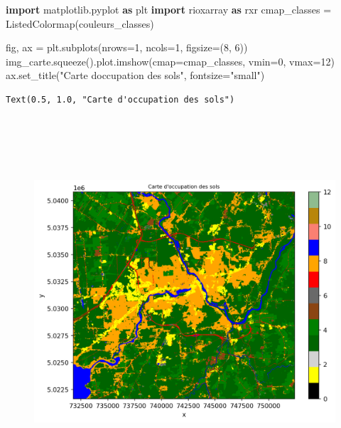 \documentclass[
]{article}
\newenvironment{Shaded}{}{}
\newcommand{\DecValTok}[1]{\textcolor[rgb]{0.25,0.63,0.44}{#1}}
\newcommand{\ImportTok}[1]{\textcolor[rgb]{0.00,0.50,0.00}{\textbf{#1}}}
\newcommand{\NormalTok}[1]{#1}
\newcommand{\OperatorTok}[1]{\textcolor[rgb]{0.40,0.40,0.40}{#1}}
\newcommand{\StringTok}[1]{\textcolor[rgb]{0.25,0.44,0.63}{#1}}
\begin{document}
\label{5c61a76f}
\label{cb6}
\begin{Shaded}
\begin{Highlighting}[]
\ImportTok{import}\NormalTok{ matplotlib.pyplot }\ImportTok{as}\NormalTok{ plt}
\ImportTok{import}\NormalTok{ rioxarray }\ImportTok{as}\NormalTok{ rxr}
\NormalTok{cmap\_classes }\OperatorTok{=}\NormalTok{ ListedColormap(couleurs\_classes)}

\NormalTok{fig, ax }\OperatorTok{=}\NormalTok{ plt.subplots(nrows}\OperatorTok{=}\DecValTok{1}\NormalTok{, ncols}\OperatorTok{=}\DecValTok{1}\NormalTok{, figsize}\OperatorTok{=}\NormalTok{(}\DecValTok{8}\NormalTok{, }\DecValTok{6}\NormalTok{))}
\NormalTok{img\_carte.squeeze().plot.imshow(cmap}\OperatorTok{=}\NormalTok{cmap\_classes, vmin}\OperatorTok{=}\DecValTok{0}\NormalTok{, vmax}\OperatorTok{=}\DecValTok{12}\NormalTok{)}
\NormalTok{ax.set\_title(}\StringTok{"Carte d\textquotesingle{}occupation des sols"}\NormalTok{, fontsize}\OperatorTok{=}\StringTok{"small"}\NormalTok{)}
\end{Highlighting}
\end{Shaded}

\begin{verbatim}
Text(0.5, 1.0, "Carte d'occupation des sols")
\end{verbatim}

\begin{figure}
\centering
\includegraphics[width=6.75in,height=5.40625in]{05-ClassificationsSupervisees_files/figure-html/cell-8-output-2.png}
\caption{}
\end{figure}
\end{document}
